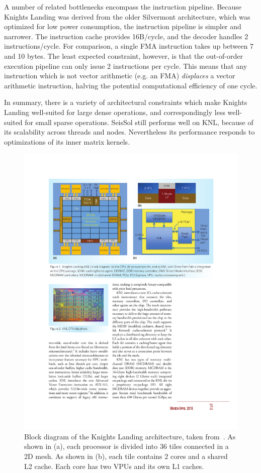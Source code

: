 A number of related bottlenecks encompass the instruction pipeline. Because Knights Landing was derived from the older Silvermont architecture, which was optimized for low power consumption, the instruction pipeline is simpler and narrower. The instruction cache provides 16B/cycle, and the decoder handles 2 instructions/cycle. For comparison, a single \gls{FMA} instruction takes up between 7 and 10 bytes. The least expected constraint, however, is that the out-of-order execution pipeline can only issue 2 instructions per cycle. This means that any instruction which is not vector arithmetic (e.g. an FMA) \emph{displaces} a vector arithmetic instruction, halving the potential computational efficiency of one cycle.

In summary, there is a variety of architectural constraints which make Knights Landing well-suited for large dense operations, and correspondingly less well-suited for small sparse operations. SeisSol still performs well on KNL, because of its scalability across threads and nodes. Nevertheless its performance responds to optimizations of its inner matrix kernels.

\begin{figure}[tb]
\centering
\includegraphics[width=\textwidth]{images/knl_arch.pdf}
\caption{Block diagram of the Knights Landing architecture, taken from~\cite{Sodani:2016:KLS:2927511.2927563}. As shown in (a), each processor is divided into 36 tiles connected in a 2D mesh. As shown in (b), each tile contains 2 cores and a shared L2 cache. Each core has two VPUs and its own L1 caches.}
\end{figure}


